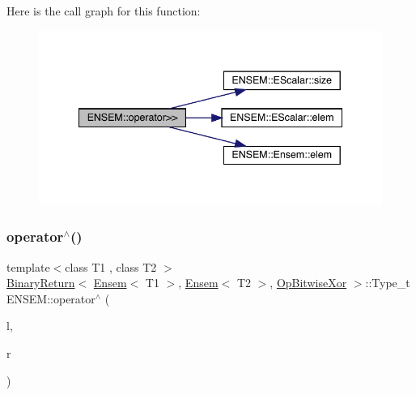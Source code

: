 Here is the call graph for this function\+:\nopagebreak
\begin{figure}[H]
\begin{center}
\leavevmode
\includegraphics[width=341pt]{d1/d9e/group__eensem_ga8dbc329d9b31f5c8d7f4c54f10ea370b_cgraph}
\end{center}
\end{figure}
\mbox{\label{group__eensem_gac8825f09186c8e0f8550839946bf2d37}} 
\subsubsection{\texorpdfstring{operator$^\wedge$()}{operator^()}\hspace{0.1cm}{\footnotesize\ttfamily [1/3]}}
{\footnotesize\ttfamily template$<$class T1 , class T2 $>$ \\
\mbox{\hyperlink{structENSEM_1_1BinaryReturn}{Binary\+Return}}$<$ \mbox{\hyperlink{classENSEM_1_1Ensem}{Ensem}}$<$ T1 $>$, \mbox{\hyperlink{classENSEM_1_1Ensem}{Ensem}}$<$ T2 $>$, \mbox{\hyperlink{structENSEM_1_1OpBitwiseXor}{Op\+Bitwise\+Xor}} $>$\+::Type\+\_\+t E\+N\+S\+E\+M\+::operator$^\wedge$ (\begin{DoxyParamCaption}\item[{const \mbox{\hyperlink{classENSEM_1_1Ensem}{Ensem}}$<$ T1 $>$ \&}]{l,  }\item[{const \mbox{\hyperlink{classENSEM_1_1Ensem}{Ensem}}$<$ T2 $>$ \&}]{r }\end{DoxyParamCaption})\hspace{0.3cm}{\ttfamily [inline]}}

